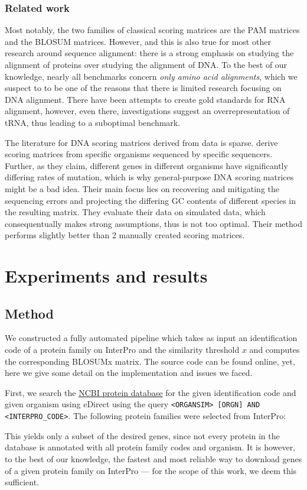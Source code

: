 \documentclass{article}
\begin{document}
\subsubsection*{Related work}
Most notably, the two families of classical scoring matrices are the PAM
matrices and the BLOSUM matrices. However, and this is also true for most other
research around sequence alignment: there is a strong emphasis on studying the
alignment of proteins over studying the alignment of DNA. To the best of our
knowledge, nearly all benchmarks concern \emph{only amino acid alignments}, which
we suspect to to be one of the reasons that there is limited research focusing
on DNA alignment. There have been attempts to create gold standards for RNA
alignment,
however, even there, investigations suggest an overrepresentation of tRNA, thus
leading to a suboptimal benchmark.

The literature for DNA scoring matrices derived from data is sparse.
\textcite{hamadaTrainingAlignmentParameters2017} derive scoring matrices from
specific organisms sequenced by specific sequencers. Further, as they claim,
different genes in different organisms have significantly differing rates of
mutation, which is why general-purpose DNA scoring matrices might be a bad
idea. Their main focus lies on recovering and mitigating the sequencing errors
and projecting the differing GC contents of different species in the resulting
matrix. They evaluate their data on simulated data, which consequentually makes
strong assumptions, thus is not too optimal. Their method performs slightly
better than 2 manually created scoring matrices.


\section*{Experiments and results}
\subsection*{Method}
We constructed a fully automated pipeline which takes as input an identification code of a protein
family on InterPro and the similarity threshold $x$ and computes the
corresponding BLOSUMx matrix. The source code can be found online, yet, here we
give some detail on the implementation and issues we faced.

First, we search the \href{https://www.ncbi.nlm.nih.gov/protein}{NCBI protein
database} for the given identification code and given organism using eDirect
using the query \texttt{<ORGANSIM> [ORGN] AND <INTERPRO\_CODE>}.
The following protein families were selected from InterPro:
 
This yields only a subset of the desired genes, since not every
protein in the database is annotated with all protein family codes and organism. It is
however, to the best of our knowledge, the fastest and most reliable way to
download genes of a given protein family on InterPro --- for the scope of this
work, we deem this sufficient.
\end{document}
